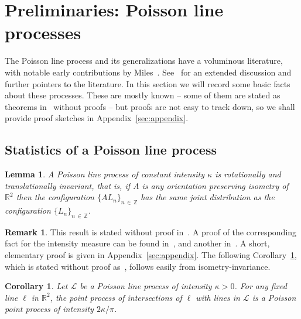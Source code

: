 \documentclass[10pt]{amsart}
\newtheorem{lemm}[theo]{Lemma}\newtheorem{prop}[theo]{Proposition}\newtheorem{coro}[theo]{Corollary}\newtheorem{conj}[theo]{Conjecture}
\theoremstyle{definition}\newtheorem{defi}[theo]{Definition}\newtheorem{rema}[theo]{Remark}\newtheorem{exam}[theo]{Example}\newtheorem{exem}[theo]{Example}\newtheorem{nota}[theo]{Notation}
\newcommand{\zz}[1]{\mathbb #1}
\begin{document}
\section{Preliminaries: Poisson line processes} \label{sec:preliminaries}
The Poisson line process and its generalizations have a voluminous literature, with notable early contributions by Miles~\cite{miles:pnas1,miles:pnas2}. See~\cite{kendall-et-al} for an extended discussion and further pointers to the literature. In this section we will record some basic facts about these processes. These are mostly known -- some of them are stated as theorems in~\cite{miles:pnas1} without proofs -- but proofs are not easy to track down, so we shall provide proof sketches in Appendix~\ref{sec:appendix}.



\subsection{Statistics of a Poisson line process}\label{ssec:plp}

\begin{lemm}\label{lemma:translation-invariance}
A Poisson line process of constant intensity $\kappa$ is rotationally and translationally invariant, that is, if $A$ is any orientation preserving isometry of $\zz{R}^{2}$ then the configuration $\{AL_{n} \}_{n\,\in\,\zz{Z}}$ has the same joint distribution as the configuration $\{L_{n} \}_{n\,\in\,\zz{Z}}$.
\end{lemm}

\begin{rema}\label{remark:ti}
This result is stated without proof in~\cite{miles:pnas1}. A proof of the corresponding fact for the intensity measure can be found in~\cite{santalo}, and another in~\cite[Chapter~8]{kendall-et-al}. A short, elementary proof is given in Appendix~\ref{sec:appendix}. The following Corollary~\ref{corollary:line-intensity}, which is stated without proof as~\cite[Theorem~2]{miles:pnas1}, follows easily from isometry-invariance.
\end{rema}

\begin{coro}\label{corollary:line-intensity}
Let $\mathcal{L}$ be a Poisson line process of intensity $\kappa>0$. For any fixed line $\ell$ in $\mathbb{R}^{2}$, the point process of intersections of $\ell$ with lines in $\mathcal{L}$ is a Poisson point process of intensity $2\kappa /\pi$.
\end{coro}
\end{document}
